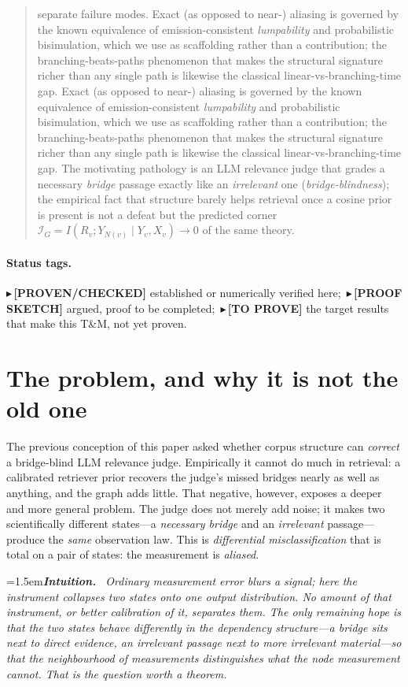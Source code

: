 \documentclass[11pt]{article}
\newcommand{\PROVEN}[1]{{\color{teal}\small$\blacktriangleright$\,\textbf{[PROVEN/CHECKED]} #1}}
\newcommand{\SKETCH}[1]{{\color{orange}\small$\blacktriangleright$\,\textbf{[PROOF SKETCH]} #1}}
\newcommand{\CONJ}[1]{{\color{violet}\small$\blacktriangleright$\,\textbf{[TO PROVE]} #1}}
\newenvironment{intuition}{\par\smallskip\noindent\hangindent=1.5em\textbf{\itshape Intuition.}\itshape\ \ignorespaces}{\par\smallskip}
\begin{document}
\begin{abstract}
separate failure modes. Exact (as opposed to near-) aliasing is governed by the known equivalence of emission-consistent
\emph{lumpability} and probabilistic bisimulation, which we use as scaffolding rather than a contribution; the
branching-beats-paths phenomenon that makes the structural signature richer than any single path is likewise the
classical linear-vs-branching-time gap. Exact (as opposed to near-) aliasing is governed by the known equivalence of emission-consistent
\emph{lumpability} and probabilistic bisimulation, which we use as scaffolding rather than a contribution; the
branching-beats-paths phenomenon that makes the structural signature richer than any single path is likewise the
classical linear-vs-branching-time gap. The motivating pathology is an LLM relevance judge that grades a necessary
\emph{bridge} passage exactly like an \emph{irrelevant} one (\emph{bridge-blindness}); the empirical fact that
structure barely helps retrieval once a cosine prior is present is not a defeat but the predicted corner
$\mathcal I_G=I(R_v;Y_{N(v)}\mid Y_v,X_v)\to0$ of the same theory.
\end{abstract}

\paragraph{Status tags.} \PROVEN{} established or numerically verified here;\ \SKETCH{} argued, proof to be
completed;\ \CONJ{} the target results that make this T\&M, not yet proven.

\tableofcontents

\section{The problem, and why it is not the old one}
The previous conception of this paper asked whether corpus structure can \emph{correct} a bridge-blind LLM
relevance judge. Empirically it cannot do much in retrieval: a calibrated retriever prior recovers the judge's
missed bridges nearly as well as anything, and the graph adds little. That negative, however, exposes a deeper
and more general problem. The judge does not merely add noise; it makes two scientifically different states---a
\emph{necessary bridge} and an \emph{irrelevant} passage---produce the \emph{same} observation law. This is
\emph{differential misclassification} that is total on a pair of states: the measurement is \emph{aliased}.

\begin{intuition}
Ordinary measurement error blurs a signal; here the instrument \emph{collapses} two states onto one output
distribution. No amount of that instrument, or better calibration of it, separates them. The only remaining hope
is that the two states \emph{behave differently in the dependency structure}---a bridge sits next to direct
evidence, an irrelevant passage next to more irrelevant material---so that the \emph{neighbourhood} of
measurements distinguishes what the node measurement cannot. That is the question worth a theorem.
\end{intuition}
\end{document}
